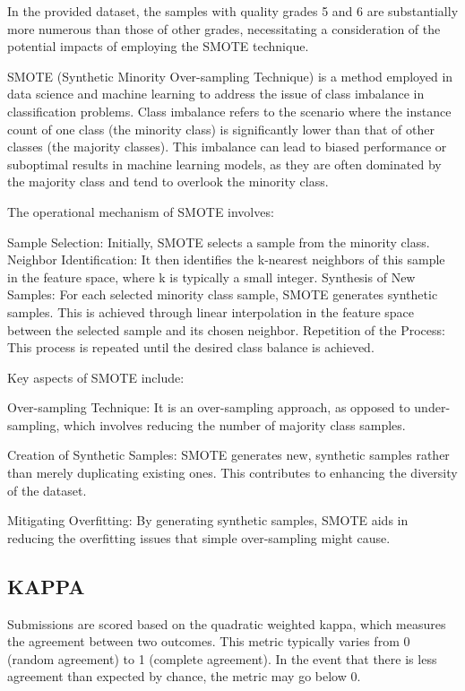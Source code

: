 In the provided dataset, the samples with quality grades 5 and 6 are substantially more numerous than those of other grades, necessitating a consideration of the potential impacts of employing the SMOTE technique.

SMOTE (Synthetic Minority Over-sampling Technique) is a method employed in data science and machine learning to address the issue of class imbalance in classification problems. Class imbalance refers to the scenario where the instance count of one class (the minority class) is significantly lower than that of other classes (the majority classes). This imbalance can lead to biased performance or suboptimal results in machine learning models, as they are often dominated by the majority class and tend to overlook the minority class. 

The operational mechanism of SMOTE involves:

Sample Selection: Initially, SMOTE selects a sample from the minority class.
Neighbor Identification: It then identifies the k-nearest neighbors of this sample in the feature space, where k is typically a small integer.
Synthesis of New Samples: For each selected minority class sample, SMOTE generates synthetic samples. This is achieved through linear interpolation in the feature space between the selected sample and its chosen neighbor.
Repetition of the Process: This process is repeated until the desired class balance is achieved.

Key aspects of SMOTE include:

Over-sampling Technique: It is an over-sampling approach, as opposed to under-sampling, which involves reducing the number of majority class samples.

Creation of Synthetic Samples: SMOTE generates new, synthetic samples rather than merely duplicating existing ones. This contributes to enhancing the diversity of the dataset.

Mitigating Overfitting: By generating synthetic samples, SMOTE aids in reducing the overfitting issues that simple over-sampling might cause.


\subsection{KAPPA}\phantom{...}

Submissions are scored based on the quadratic weighted kappa, which measures the agreement between two outcomes. This metric typically varies from 0 (random agreement) to 1 (complete agreement). In the event that there is less agreement than expected by chance, the metric may go below 0.

